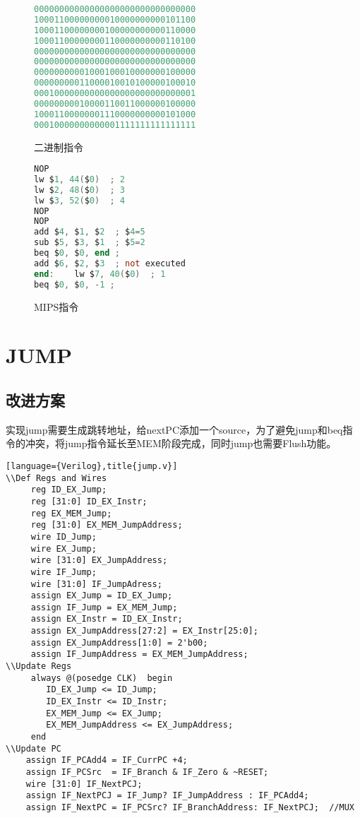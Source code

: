 \documentclass[a4paper]{article}
\begin{document}
        \begin{figure}[h]
        \begin{minipage}[t]{0.54\linewidth}
        \centering
            \begin{lstlisting}[language={Verilog}]
00000000000000000000000000000000
10001100000000010000000000101100
10001100000000100000000000110000
10001100000000110000000000110100
00000000000000000000000000000000
00000000000000000000000000000000
00000000001000100010000000100000
00000000011000010010100000100010
00010000000000000000000000000001
00000000010000110011000000100000
10001100000001110000000000101000
00010000000000001111111111111111  \end{lstlisting}
        \caption{二进制指令}
        \end{minipage}%
        \begin{minipage}[t]{0.46\linewidth}
        \centering
            \begin{lstlisting}[language={Verilog}]
NOP
lw $1, 44($0)  ; 2
lw $2, 48($0)  ; 3
lw $3, 52($0)  ; 4
NOP
NOP
add $4, $1, $2  ; $4=5
sub $5, $3, $1  ; $5=2
beq $0, $0, end ;
add $6, $2, $3  ; not executed
end:    lw $7, 40($0)  ; 1
beq $0, $0, -1 ;   \end{lstlisting}
        \caption{MIPS指令}
        \end{minipage}
    \end{figure}

    \section{JUMP}
    \subsection{改进方案}
    实现jump需要生成跳转地址，给nextPC添加一个source，为了避免jump和beq指令的冲突，将jump指令延长至MEM阶段完成，同时jump也需要Flush功能。
    \begin{lstlisting}[language={Verilog},title{jump.v}]
\\Def Regs and Wires
	 reg ID_EX_Jump;
	 reg [31:0] ID_EX_Instr;
	 reg EX_MEM_Jump;
	 reg [31:0] EX_MEM_JumpAddress;
	 wire ID_Jump;
	 wire EX_Jump;
	 wire [31:0] EX_JumpAddress;
	 wire IF_Jump;
	 wire [31:0] IF_JumpAdress;
	 assign EX_Jump = ID_EX_Jump;
	 assign IF_Jump = EX_MEM_Jump;
	 assign EX_Instr = ID_EX_Instr;
	 assign EX_JumpAddress[27:2] = EX_Instr[25:0];
	 assign EX_JumpAddress[1:0] = 2'b00;
	 assign IF_JumpAddress = EX_MEM_JumpAddress;
\\Update Regs
	 always @(posedge CLK)	begin
		ID_EX_Jump <= ID_Jump;
		ID_EX_Instr <= ID_Instr;
		EX_MEM_Jump <= EX_Jump;
		EX_MEM_JumpAddress <= EX_JumpAddress;
	 end
\\Update PC
	assign IF_PCAdd4 = IF_CurrPC +4;
	assign IF_PCSrc  = IF_Branch & IF_Zero & ~RESET;
	wire [31:0] IF_NextPCJ;
	assign IF_NextPCJ = IF_Jump? IF_JumpAddress : IF_PCAdd4;
	assign IF_NextPC = IF_PCSrc? IF_BranchAddress: IF_NextPCJ;  //MUX  \end{lstlisting}
\end{document}
